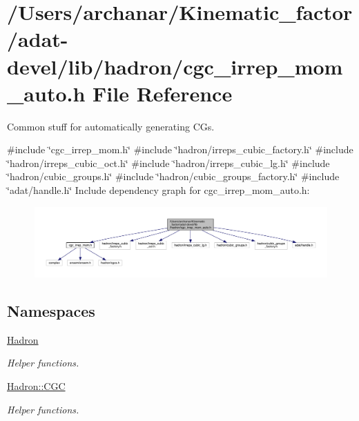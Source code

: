 \hypertarget{adat-devel_2lib_2hadron_2cgc__irrep__mom__auto_8h}{}\section{/\+Users/archanar/\+Kinematic\+\_\+factor/adat-\/devel/lib/hadron/cgc\+\_\+irrep\+\_\+mom\+\_\+auto.h File Reference}
\label{adat-devel_2lib_2hadron_2cgc__irrep__mom__auto_8h}


Common stuff for automatically generating C\+Gs.  


{\ttfamily \#include \char`\"{}cgc\+\_\+irrep\+\_\+mom.\+h\char`\"{}}\newline
{\ttfamily \#include \char`\"{}hadron/irreps\+\_\+cubic\+\_\+factory.\+h\char`\"{}}\newline
{\ttfamily \#include \char`\"{}hadron/irreps\+\_\+cubic\+\_\+oct.\+h\char`\"{}}\newline
{\ttfamily \#include \char`\"{}hadron/irreps\+\_\+cubic\+\_\+lg.\+h\char`\"{}}\newline
{\ttfamily \#include \char`\"{}hadron/cubic\+\_\+groups.\+h\char`\"{}}\newline
{\ttfamily \#include \char`\"{}hadron/cubic\+\_\+groups\+\_\+factory.\+h\char`\"{}}\newline
{\ttfamily \#include \char`\"{}adat/handle.\+h\char`\"{}}\newline
Include dependency graph for cgc\+\_\+irrep\+\_\+mom\+\_\+auto.\+h\+:
\nopagebreak
\begin{figure}[H]
\begin{center}
\leavevmode
\includegraphics[width=350pt]{de/d7e/adat-devel_2lib_2hadron_2cgc__irrep__mom__auto_8h__incl}
\end{center}
\end{figure}
\subsection*{Namespaces}
\begin{DoxyCompactItemize}
\item 
 \mbox{\hyperlink{namespaceHadron}{Hadron}}
\begin{DoxyCompactList}\small\item\em Helper functions. \end{DoxyCompactList}\item 
 \mbox{\hyperlink{namespaceHadron_1_1CGC}{Hadron\+::\+C\+GC}}
\begin{DoxyCompactList}\small\item\em Helper functions. \end{DoxyCompactList}\end{DoxyCompactItemize}
